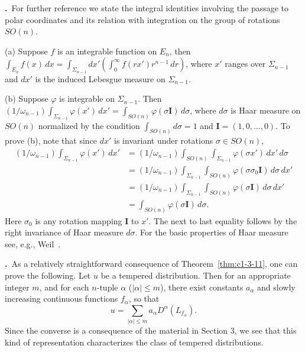 \label{eq:c1-4-14}\textbf{\theequation.}~For further
reference we state the integral identities involving the passage to polar
coordinates and its relation with integration on the group of rotations
$SO(n)$.

\textup{(a)} Suppose $f$ is an integrable function on $E_{n}$, then
$\int_{E_{n}} f(x) \, dx = \int_{\Sigma_{n-1}} dx' (\int_{0}^{\infty} f(rx') r^{n-1} \, dr)$,
where $x'$ ranges over $\Sigma_{n-1}$ and $dx'$ is the induced Lebesgue
measure on $\Sigma_{n-1}$.

\textup{(b)} Suppose $\varphi$ is integrable on $\Sigma_{n-1}$. Then
$(1/\omega_{n-1})\int_{\Sigma_{n-1}} \varphi(x') \, dx' = \int_{SO(n)} \varphi(\sigma\mathbf{I}) \, d\sigma$,
where $d\sigma$ is Haar measure on $SO(n)$ normalized by the condition
$\int_{SO(n)} d\sigma = 1$ and $\mathbf{I} = (1, 0, \ldots, 0)$. To prove (b),
note that since $dx'$ is invariant under rotations $\sigma \in SO(n)$,
\[
\begin{aligned}(1/\omega_{n-1})\int_{\Sigma_{n-1}} \varphi(x') \, dx'&=(1/\omega_{n-1})\int_{SO(n)}\int_{\Sigma_{n-1}} \varphi(\sigma x') \, dx' \, d\sigma\\
&=(1/\omega_{n-1})\int_{\Sigma_{n-1}}\int_{SO(n)} \varphi(\sigma\sigma_{0}\mathbf{I}) \, d\sigma \, dx'\\
&=(1/\omega_{n-1})\int_{\Sigma_{n-1}}\int_{SO(n)} \varphi(\sigma\mathbf{I}) \, d\sigma \, dx'\\
&=\int_{SO(n)} \varphi(\sigma\mathbf{I}) \, d\sigma.\end{aligned}
\]
Here $\sigma_{0}$ is any rotation mapping $\mathbf{I}$ to $x'$. The next to
last equality follows by the right invariance of Haar measure $d\sigma$. For
the basic properties of Haar measure see, e.g., Weil~\cite{Weil1}.

\label{eq:c1-4-15}\textbf{\theequation.}~As a
relatively straightforward consequence of Theorem~\ref{thm:c1-3-11}, one can
prove the following. Let $u$ be a tempered distribution. Then for an
appropriate integer $m$, and for each $n$-tuple $\alpha$ ($|\alpha| \leq m$),
there exist constants $a_{\alpha}$ and slowly increasing continuous functions
$f_{\alpha}$, so that
\[
u=\sum_{|\alpha|\leq m}a_{\alpha}D^{\alpha}(L_{f_{\alpha}}).
\]
Since the converse is a consequence of the material in Section 3, we see that
this kind of representation characterizes the class of tempered distributions.

\bibnoteshead

